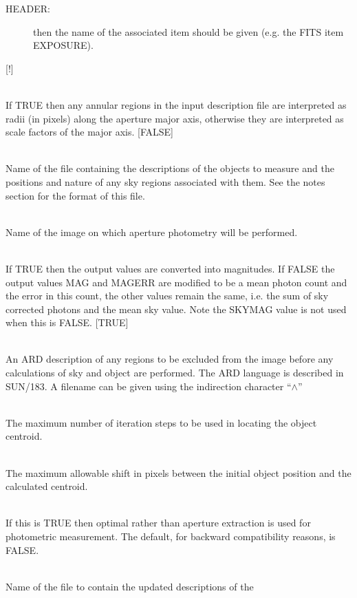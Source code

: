 \documentclass[twoside,11pt]{article}
\newcommand{\xref}[3]{#1}
\renewcommand{\_}{\texttt{\symbol{95}}}
\newcommand{\qt}[1]{``#1''}
\newcommand{\sstsubsection}[1]{ \item[{#1}] \mbox{} \\}
\newcommand{\sstsubsection}[1]{\item[{#1}]}
\begin{document}
{{{\begin{description}
          \item[HEADER:] then the name of the associated item should be given
            (e.g. the FITS item EXPOSURE).

        \end{description}
        [!]
      }
      \sstsubsection{
         FIXANN = \_LOGICAL (Read)
      }{
         If TRUE then any annular regions in the input description file
         are interpreted as radii (in pixels) along the aperture major
         axis, otherwise they are interpreted as scale factors of the
         major axis.
         [FALSE]
      }
      \sstsubsection{
         INFILE = LITERAL (Read)
      }{
         Name of the file containing the descriptions of the objects to
         measure and the positions and nature of any sky regions associated
         with them. See the notes section for the format of this file.
      }
      \sstsubsection{
         IN = IMAGE (Read)
      }{
         Name of the image on which aperture photometry will be
         performed.
      }
      \sstsubsection{
         USEMAGS = \_LOGICAL (Read)
      }{
         If TRUE then the output values are converted into magnitudes.
         If FALSE the output values MAG and MAGERR are modified to be
         a mean photon count and the error in this count, the other
         values remain the same, i.e. the sum of sky corrected photons
         and the mean sky value. Note the SKYMAG value is not used
         when this is FALSE.
         [TRUE]
      }
      \sstsubsection{
         MASK = LITERAL (Read)
      }{
         An ARD description of any regions to be excluded from the image
         before any calculations of sky and object are performed. The
         ARD language is described in \xref{SUN/183}{sun183}{}. A
         filename can be given using the indirection character
         \qt{$\wedge$}
      }
      \sstsubsection{
         MAXITER = \_INTEGER (Read)
      }{
         The maximum number of iteration steps to be used in locating
         the object centroid.
      }
      \sstsubsection{
         MAXSHIFT = \_REAL (Read)
      }{
         The maximum allowable shift in pixels between the initial
         object position and the calculated centroid.
      }
      \sstsubsection{
         OPTIMA = \_LOGICAL (Read)
      }{
         If this is TRUE then optimal rather than aperture extraction
         is used for photometric measurement. The default, for backward
         compatibility reasons, is FALSE.
      }
      \sstsubsection{
         OUTFILE = FILENAME (Read)
      }{
         Name of the file to contain the updated descriptions of the
}}}
\end{document}
